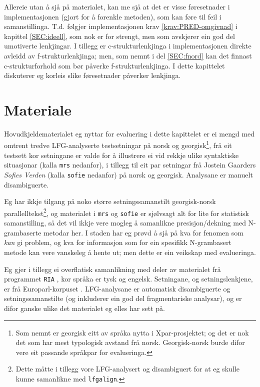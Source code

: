 \documentclass[11pt,a4paper,oneside,draft]{book}
\begin{document}
 Allereie utan å sjå på materialet, kan me sjå at det er visse
 føresetnader i implementasjonen (gjort for å forenkle metoden), som
 kan føre til feil i samanstillinga. T.d. følgjer implementasjonen
 krav \ref{krav:PRED-omgivnad} i kapittel \ref{SEC:ideell}, som nok er
 for strengt, men som avskjerer ein god del umotiverte lenkjingar. I
 tillegg er c-strukturlenkjinga i implementasjonen direkte avleidd av
 f-strukturlenkjinga; men, som nemnt i del \ref{SEC:fnord} kan det
 finnast c-strukturforhold som bør påverke f-strukturlenkjinga. I
 dette kapittelet diskuterer eg korleis slike føresetnader påverker
 lenkjinga.
 
\section{Materiale}
\label{sec-5.1}

 Hovudkjeldematerialet eg nyttar for evaluering i dette kapittelet er
 ei mengd med omtrent tredve LFG-analyserte testsetningar på norsk og
 georgisk\footnote{Som nemnt er georgisk eitt av språka nytta i Xpar-prosjektet;
        og det er nok det som har mest typologisk avstand frå
        norsk. Georgisk-norsk burde difor vere eit passande språkpar
        for evalueringa. }, frå eit testsett kor setningane er valde for å
 illustrere ei vid rekkje ulike syntaktiske situasjonar (kalla \texttt{mrs}
 nedanfor), i tillegg til eit par setningar frå Jostein Gaarders
 \emph{Sofies Verden} (kalla \texttt{sofie} nedanfor) på norsk og
 georgisk. Analysane er manuelt disambiguerte.

 Eg har ikkje tilgang på noko større setningssamanstilt georgisk-norsk
 parallelltekst\footnote{Dette måtte i tillegg vore LFG-analysert og disambiguert for
        at eg skulle kunne samanlikne med \texttt{lfgalign}. }, og materialet i \texttt{mrs} og \texttt{sofie} er sjølvsagt
 alt for lite for statistisk samanstilling, så det vil ikkje vere
 mogleg å samanlikne presisjon/dekning med N-grambaserte metodar
 her. I staden har eg prøvd å sjå på kva for fenomen som \emph{kan} gi
 problem, og kva for informasjon som for ein spesifikk N-grambasert
 metode kan vere vanskeleg å hente ut; men dette er ein veikskap med
 evalueringa.

 Eg gjer i tillegg ei overflatisk samanlikning med deler av materialet
 frå programmet \texttt{RIA} \citep{graham2009osr,graham2009fts}, kor språka
 er tysk og engelsk. Setningane, og setningslenkjene, er frå
 Europarl-korpuset \citep{koehn2005emc}. LFG-analysane er automatisk
 disambiguerte og setningssamanstilte (og inkluderer ein god del
 fragmentariske analysar), og er difor ganske ulike det materialet eg
 elles har sett på.
\end{document}
